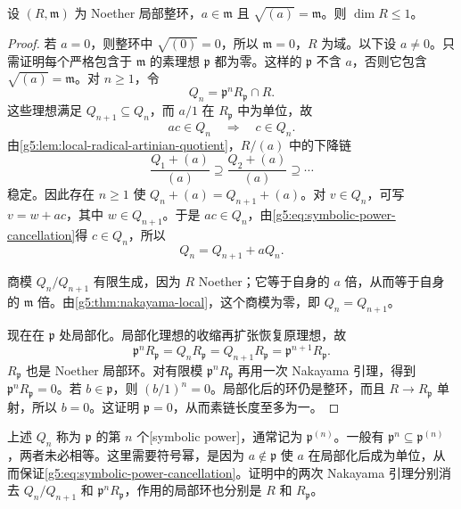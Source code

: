 \begin{lemma}\label{g5:lem:principal-local-domain}
	设 \((R,\mathfrak m)\) 为 Noether 局部整环，\(a\in\mathfrak m\) 且 \(\sqrt{(a)}=\mathfrak m\)。则 \(\dim R\leq1\)。
\end{lemma}
\begin{proof}
	若 \(a=0\)，则整环中 \(\sqrt{(0)}=0\)，所以 \(\mathfrak m=0\)，\(R\) 为域。以下设 \(a\ne0\)。只需证明每个严格包含于 \(\mathfrak m\) 的素理想 \(\mathfrak p\) 都为零。这样的 \(\mathfrak p\) 不含 \(a\)，否则它包含 \(\sqrt{(a)}=\mathfrak m\)。对 \(n\geq1\)，令
	\[
	Q_n=\mathfrak p^nR_{\mathfrak p}\cap R.
	\]
	这些理想满足 \(Q_{n+1}\subseteq Q_n\)，而 \(a/1\) 在 \(R_{\mathfrak p}\) 中为单位，故
	\begin{equation}\label{g5:eq:symbolic-power-cancellation}
	ac\in Q_n\quad\Longrightarrow\quad c\in Q_n.
	\end{equation}
	由\cref{g5:lem:local-radical-artinian-quotient}，\(R/(a)\) 中的下降链
	\[
	\frac{Q_1+(a)}{(a)}\supseteq
	\frac{Q_2+(a)}{(a)}\supseteq\cdots
	\]
	稳定。因此存在 \(n\geq1\) 使 \(Q_n+(a)=Q_{n+1}+(a)\)。对 \(v\in Q_n\)，可写 \(v=w+ac\)，其中 \(w\in Q_{n+1}\)。于是 \(ac\in Q_n\)，由\eqref{g5:eq:symbolic-power-cancellation}得 \(c\in Q_n\)，所以
	\[
	Q_n=Q_{n+1}+aQ_n.
	\]

	商模 \(Q_n/Q_{n+1}\) 有限生成，因为 \(R\) Noether；它等于自身的 \(a\) 倍，从而等于自身的 \(\mathfrak m\) 倍。由\cref{g5:thm:nakayama-local}，这个商模为零，即 \(Q_n=Q_{n+1}\)。

	现在在 \(\mathfrak p\) 处局部化。局部化理想的收缩再扩张恢复原理想，故
	\[
	\mathfrak p^nR_{\mathfrak p}=Q_nR_{\mathfrak p}
	=Q_{n+1}R_{\mathfrak p}=\mathfrak p^{n+1}R_{\mathfrak p}.
	\]
	\(R_{\mathfrak p}\) 也是 Noether 局部环。对有限模 \(\mathfrak p^nR_{\mathfrak p}\) 再用一次 Nakayama 引理，得到 \(\mathfrak p^nR_{\mathfrak p}=0\)。若 \(b\in\mathfrak p\)，则 \((b/1)^n=0\)。局部化后的环仍是整环，而且 \(R\rightarrow R_{\mathfrak p}\) 单射，所以 \(b=0\)。这证明 \(\mathfrak p=0\)，从而素链长度至多为一。
\end{proof}

上述 \(Q_n\) 称为 \(\mathfrak p\) 的第 \(n\) 个[symbolic power]，通常记为 \(\mathfrak p^{(n)}\)。一般有 \(\mathfrak p^n\subseteq\mathfrak p^{(n)}\)，两者未必相等。这里需要符号幂，是因为 \(a\notin\mathfrak p\) 使 \(a\) 在局部化后成为单位，从而保证\eqref{g5:eq:symbolic-power-cancellation}。证明中的两次 Nakayama 引理分别消去 \(Q_n/Q_{n+1}\) 和 \(\mathfrak p^nR_{\mathfrak p}\)，作用的局部环也分别是 \(R\) 和 \(R_{\mathfrak p}\)。

